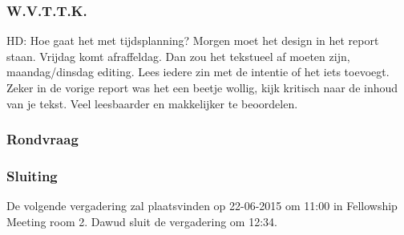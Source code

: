 \subsubsection{W.V.T.T.K.}
HD: Hoe gaat het met tijdsplanning? Morgen moet het design in het report staan. Vrijdag komt afraffeldag. Dan zou het tekstueel af moeten zijn, maandag/dinsdag editing. Lees iedere zin met de intentie of het iets toevoegt. Zeker in de vorige report was het een beetje wollig, kijk kritisch naar de inhoud van je tekst. Veel leesbaarder en makkelijker te beoordelen.

\subsubsection{Rondvraag}

\subsubsection{Sluiting}
De volgende vergadering zal plaatsvinden op 22-06-2015 om 11:00 in Fellowship Meeting room 2.
\newline\newline
Dawud sluit de vergadering om 12:34.